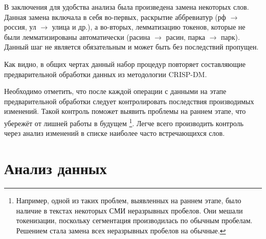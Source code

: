 В заключения для удобства анализа была произведена замена некоторых слов. Данная замена включала в себя во-первых, раскрытие аббревиатур (рф $\to$ россия, ул $\to$ улица и др.), а во-вторых, лемматизацию токенов, которые не были лемматизированы автоматически (расина $\to$ расин, парка $\to$ парк). Данный шаг не является обязательным и может быть без последствий пропущен.

Как видно, в общих чертах данный набор процедур повторяет составляющие предварительной обработки данных из методологии CRISP-DM.

Необходимо отметить, что после каждой операции с данными на этапе предварительной обработки следует контролировать последствия производимых изменений. Такой контроль поможет выявить проблемы на раннем этапе, что убережёт от лишней работы в будущем \footnote{Например, одной из таких проблем, выявленных на раннем этапе, было наличие в текстах некоторых СМИ неразрывных пробелов. Они мешали токенизации, поскольку сегментация производилась по обычным пробелам. Решением стала замена всех неразрывных пробелов на обычные.}. Легче всего производить контроль через анализ изменений в списке наиболее часто встречающихся слов.

\section{Анализ данных}




\clearpage